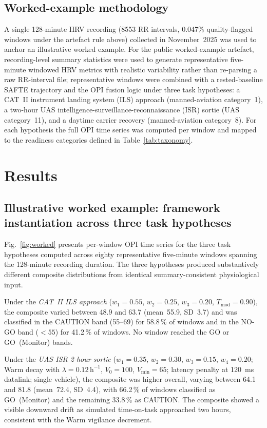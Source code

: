 \documentclass[10pt,journal,twocolumn,compsoc]{IEEEtran}
\begin{document}
\subsection{Worked-example methodology}
A single 128-minute HRV recording (8553 RR intervals, 0.047\% quality-flagged windows under the artefact rule above) collected in November~2025 was used to anchor an illustrative worked example. For the public worked-example artefact, recording-level summary statistics were used to generate representative five-minute windowed HRV metrics with realistic variability rather than re-parsing a raw RR-interval file; representative windows were combined with a rested-baseline SAFTE trajectory and the OPI fusion logic under three task hypotheses: a CAT~II instrument landing system (ILS) approach (manned-aviation category~1), a two-hour UAS intelligence-surveillance-reconnaissance (ISR) sortie (UAS category~11), and a daytime carrier recovery (manned-aviation category~8). For each hypothesis the full OPI time series was computed per window and mapped to the readiness categories defined in Table~\ref{tab:taxonomy}.

\section{Results}

\subsection{Illustrative worked example: framework instantiation across three task hypotheses}
\label{sec:worked}
Fig.~\ref{fig:worked} presents per-window OPI time series for the three task hypotheses computed across eighty representative five-minute windows spanning the 128-minute recording duration. The three hypotheses produced substantively different composite distributions from identical summary-consistent physiological input.

Under the \emph{CAT~II ILS approach} ($w_1{=}0.55$, $w_2{=}0.25$, $w_3{=}0.20$, $T_{\mathrm{mod}}{=}0.90$), the composite varied between 48.9 and 63.7 (mean~55.9, SD~3.7) and was classified in the CAUTION band (55--69) for 58.8\,\% of windows and in the NO-GO band ($<55$) for 41.2\,\% of windows. No window reached the GO or GO~(Monitor) bands.

Under the \emph{UAS ISR 2-hour sortie} ($w_1{=}0.35$, $w_2{=}0.30$, $w_3{=}0.15$, $w_4{=}0.20$; Warm decay with $\lambda{=}0.12\,\mathrm{h}^{-1}$, $V_0{=}100$, $V_{\min}{=}65$; latency penalty at 120~ms datalink; single vehicle), the composite was higher overall, varying between 64.1 and 81.8 (mean~72.4, SD~4.4), with 66.2\,\% of windows classified as GO~(Monitor) and the remaining 33.8\,\% as CAUTION. The composite showed a visible downward drift as simulated time-on-task approached two hours, consistent with the Warm vigilance decrement.
\end{document}

